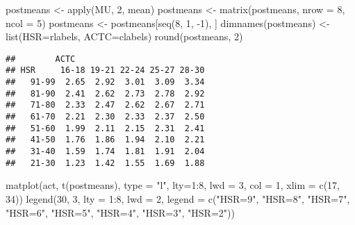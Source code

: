 \documentclass[
]{book}
\newenvironment{Shaded}{\begin{snugshade}}{\end{snugshade}}
\newcommand{\AttributeTok}[1]{\textcolor[rgb]{0.77,0.63,0.00}{#1}}
\newcommand{\DecValTok}[1]{\textcolor[rgb]{0.00,0.00,0.81}{#1}}
\newcommand{\FunctionTok}[1]{\textcolor[rgb]{0.00,0.00,0.00}{#1}}
\newcommand{\NormalTok}[1]{#1}
\newcommand{\OtherTok}[1]{\textcolor[rgb]{0.56,0.35,0.01}{#1}}
\newcommand{\SpecialCharTok}[1]{\textcolor[rgb]{0.00,0.00,0.00}{#1}}
\newcommand{\StringTok}[1]{\textcolor[rgb]{0.31,0.60,0.02}{#1}}
\begin{document}
\begin{Shaded}
\begin{Highlighting}[]
\NormalTok{postmeans }\OtherTok{\textless{}{-}} \FunctionTok{apply}\NormalTok{(MU, }\DecValTok{2}\NormalTok{, mean)}
\NormalTok{postmeans }\OtherTok{\textless{}{-}} \FunctionTok{matrix}\NormalTok{(postmeans, }\AttributeTok{nrow =} \DecValTok{8}\NormalTok{, }\AttributeTok{ncol =} \DecValTok{5}\NormalTok{)}
\NormalTok{postmeans }\OtherTok{\textless{}{-}}\NormalTok{ postmeans[}\FunctionTok{seq}\NormalTok{(}\DecValTok{8}\NormalTok{, }\DecValTok{1}\NormalTok{, }\SpecialCharTok{{-}}\DecValTok{1}\NormalTok{), ]}
\FunctionTok{dimnames}\NormalTok{(postmeans) }\OtherTok{\textless{}{-}}
  \FunctionTok{list}\NormalTok{(}\AttributeTok{HSR=}\NormalTok{rlabels, }\AttributeTok{ACTC=}\NormalTok{clabels)}
\FunctionTok{round}\NormalTok{(postmeans, }\DecValTok{2}\NormalTok{)}
\end{Highlighting}
\end{Shaded}

\begin{verbatim}
##        ACTC
## HSR     16-18 19-21 22-24 25-27 28-30
##   91-99  2.65  2.92  3.01  3.09  3.34
##   81-90  2.41  2.62  2.73  2.78  2.92
##   71-80  2.33  2.47  2.62  2.67  2.71
##   61-70  2.21  2.30  2.33  2.37  2.50
##   51-60  1.99  2.11  2.15  2.31  2.41
##   41-50  1.76  1.86  1.94  2.10  2.21
##   31-40  1.59  1.74  1.81  1.91  2.04
##   21-30  1.23  1.42  1.55  1.69  1.88
\end{verbatim}

\begin{Shaded}
\begin{Highlighting}[]
\FunctionTok{matplot}\NormalTok{(act, }\FunctionTok{t}\NormalTok{(postmeans), }\AttributeTok{type =} \StringTok{"l"}\NormalTok{, }
        \AttributeTok{lty=}\DecValTok{1}\SpecialCharTok{:}\DecValTok{8}\NormalTok{, }\AttributeTok{lwd =} \DecValTok{3}\NormalTok{, }\AttributeTok{col =} \DecValTok{1}\NormalTok{, }
        \AttributeTok{xlim =} \FunctionTok{c}\NormalTok{(}\DecValTok{17}\NormalTok{, }\DecValTok{34}\NormalTok{))}
\FunctionTok{legend}\NormalTok{(}\DecValTok{30}\NormalTok{, }\DecValTok{3}\NormalTok{, }\AttributeTok{lty =} \DecValTok{1}\SpecialCharTok{:}\DecValTok{8}\NormalTok{, }\AttributeTok{lwd =} \DecValTok{2}\NormalTok{, }
       \AttributeTok{legend =} \FunctionTok{c}\NormalTok{(}\StringTok{"HSR=9"}\NormalTok{, }\StringTok{"HSR=8"}\NormalTok{, }
     \StringTok{"HSR=7"}\NormalTok{, }\StringTok{"HSR=6"}\NormalTok{, }\StringTok{"HSR=5"}\NormalTok{, }\StringTok{"HSR=4"}\NormalTok{, }
     \StringTok{"HSR=3"}\NormalTok{, }\StringTok{"HSR=2"}\NormalTok{))}
\end{Highlighting}
\end{Shaded}
\end{document}
